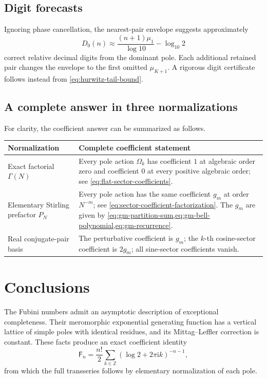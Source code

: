 \documentclass[11pt,oneside]{article}
\numberwithin{equation}{section}
\newcommand{\ii}{\mathrm i}
\newcommand{\Z}{\mathbb Z}
\newcommand{\Fub}{\mathsf F}
\begin{document}
\subsection{Digit forecasts}

Ignoring phase cancellation, the nearest-pair envelope suggests approximately
\begin{equation}
 D_0(n)\approx\frac{(n+1)\mu_1}{\log 10}-\log_{10}2
 \label{eq:digit-forecast}
\end{equation}
correct relative decimal digits from the dominant pole.  Each additional retained pair changes the envelope to the first omitted \(\mu_{K+1}\).  A rigorous digit certificate follows instead from \cref{eq:hurwitz-tail-bound}.

\subsection{A complete answer in three normalizations}

For clarity, the coefficient answer can be summarized as follows.

\begin{center}
\renewcommand{\arraystretch}{1.25}
\begin{tabular}{@{}p{}p{}@{}}
\toprule
Normalization & Complete coefficient statement\\
\midrule
Exact factorial \(\Gamma(N)\) &
Every pole action \(\Omega_k\) has coefficient \(1\) at algebraic order zero and coefficient \(0\) at every positive algebraic order; see \cref{eq:flat-sector-coefficients}.\\
Elementary Stirling prefactor \(P_N\) &
Every pole action has the same coefficient \(g_m\) at order \(N^{-m}\); see \cref{eq:sector-coefficient-factorization}.  The \(g_m\) are given by \cref{eq:gm-partition-sum,eq:gm-bell-polynomial,eq:gm-recurrence}.\\
Real conjugate-pair basis &
The perturbative coefficient is \(g_m\); the \(k\)-th cosine-sector coefficient is \(2g_m\); all sine-sector coefficients vanish.\\
\bottomrule
\end{tabular}
\end{center}

\section{Conclusions}

The Fubini numbers admit an asymptotic description of exceptional completeness.  Their meromorphic exponential generating function has a vertical lattice of simple poles with identical residues, and its Mittag--Leffler correction is constant.  These facts produce an exact coefficient identity
\[
 \Fub_n=\frac{n!}{2}\sum_{k\in\Z}(\log2+2\pi\ii k)^{-n-1},
\]
from which the full transseries follows by elementary normalization of each pole.
\end{document}
